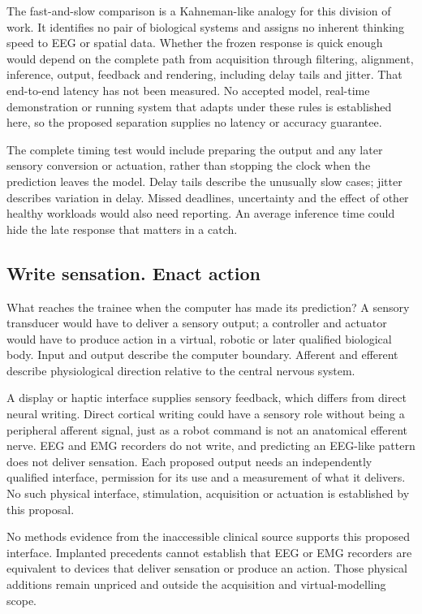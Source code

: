The fast-and-slow comparison is a Kahneman-like analogy for this division
of work. It identifies no pair of biological systems and assigns no inherent
thinking speed to EEG or spatial data. Whether the frozen response is quick
enough would depend on the complete path from acquisition through filtering,
alignment, inference, output, feedback and rendering, including delay tails
and jitter. That end-to-end latency has not been measured. No accepted model,
real-time demonstration or running system that adapts under these rules is
established here, so the proposed separation supplies no latency or accuracy
guarantee.

The complete timing test would include preparing the output and any later
sensory conversion or actuation, rather than stopping the clock when the
prediction leaves the model. Delay tails describe the unusually slow cases;
jitter describes variation in delay. Missed deadlines, uncertainty and the
effect of other healthy workloads would also need reporting. An average
inference time could hide the late response that matters in a catch.

\subsection{Write sensation. Enact action}
What reaches the trainee when the computer has made its prediction? A sensory
transducer would have to deliver a sensory output; a controller and actuator
would have to produce action in a virtual, robotic or later qualified biological
body. Input and output describe the computer boundary. Afferent and efferent
describe physiological direction relative to the central nervous system.

A display or haptic interface supplies sensory feedback, which differs from direct neural writing. Direct cortical writing could have a sensory role without being a peripheral afferent signal, just as a robot command is not an anatomical efferent nerve. EEG and EMG recorders do not write, and predicting an EEG-like pattern does not deliver sensation. Each proposed output needs an independently qualified interface, permission for its use and a measurement of what it delivers. No such physical interface, stimulation, acquisition or actuation is established by this proposal.

No methods evidence from the inaccessible clinical source supports this
proposed interface. Implanted precedents cannot establish that EEG or EMG recorders are equivalent to devices that deliver sensation or produce an action. Those physical additions remain unpriced and outside the acquisition and virtual-modelling scope.

